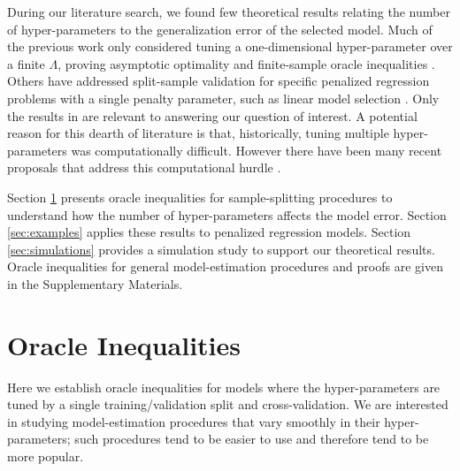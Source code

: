 \documentclass[12pt]{article} %
\theoremstyle{definition}
\begin{document}
During our literature search, we found few theoretical results relating the number of hyper-parameters to the generalization error of the selected model. 
Much of the previous work only considered tuning a one-dimensional hyper-parameter over a finite $\Lambda$, proving asymptotic optimality \citep{van2004asymptotic} and finite-sample oracle inequalities \citep{van2003unified, gyorfi2006distribution}. Others have addressed split-sample validation for specific penalized regression problems with a single penalty parameter, such as linear model selection \citep{li1987asymptotic, shao1997asymptotic, golub1979generalized, chetverikov2016cross, chatterjee2015prediction}.
Only the results in \citet{lecue2012oracle} are relevant to answering our question of interest. A potential reason for this dearth of literature is that, historically, tuning multiple hyper-parameters was computationally difficult.
However there have been many recent proposals that address this computational hurdle \citep{bengio2000gradient, foo2008efficient, snoek2012practical}.

Section \ref{sec:main_results} presents oracle inequalities for sample-splitting procedures to understand how the number of hyper-parameters affects the model error.
Section \ref{sec:examples} applies these results to penalized regression models.
Section \ref{sec:simulations} provides a simulation study to support our theoretical results.
Oracle inequalities for general model-estimation procedures and proofs are given in the Supplementary Materials.



\section{Oracle Inequalities} \label{sec:main_results}

Here we establish oracle inequalities for models where the hyper-parameters are tuned by a single training/validation split and cross-validation.
We are interested in studying model-estimation procedures that vary smoothly in their hyper-parameters; such procedures tend to be easier to use and therefore tend to be more popular.
\end{document}
